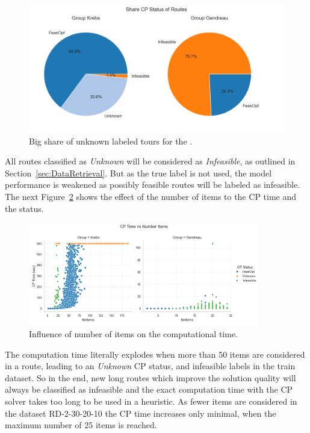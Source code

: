 \begin{figure}[ht]
    \centering
    \includegraphics[width=\textwidth]{pictures/comparison_krebs_gendreau/pie_chart_share_cp_status.png}
    \caption{Big share of unknown labeled tours for the \krebsADataSet.}
    \label{fig:comparison_krebs_gendreau_piechart}
\end{figure}
All routes classified as \textit{Unknown} will be considered as \textit{Infeasible}, as outlined in Section~\ref{sec:DataRetrieval}. But
as the true label is not used, the model performance is weakened as possibly feasible routes will be labeled as infeasible. The
next Figure~\ref{fig:comparison_krebs_gendreau_numberItems} shows the effect of the number of items to the \gls{CP} time and the status.

\begin{figure}[ht]
    \centering
    \includegraphics[width=0.9\textwidth]{pictures/comparison_krebs_gendreau/number_items_cp_status.png}
    \caption{Influence of number of items on the computational time.}
    \label{fig:comparison_krebs_gendreau_numberItems}
\end{figure}

The computation time literally explodes when more than 50 items are considered in a route, leading to an \textit{Unknown} \gls{CP} status, and
infeasible labels in the train dataset. So in the end, new long routes which improve the solution quality will always be classified as infeasible
and the exact computation time with the \gls{CP} solver takes too long to be used in a heuristic. As fewer items are considered in the dataset
RD-2-30-20-10 the \gls{CP} time increases only minimal, when the maximum number of 25 items is reached.

